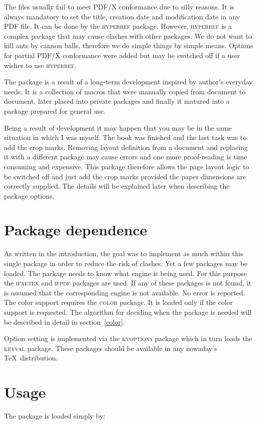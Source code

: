 \documentclass[11pt]{article}
\let\pkg\textsc
\begin{document}
The files usually fail to meet PDF/X conformance due to silly reasons. It is always mandatory to
set the title, creation date and modification date in any PDF file. It can be done by the
\pkg{hyperref} package. However, \pkg{hyperref} is a complex package that may cause clashes with
other packages. We do not want to kill ants by cannon balls, therefore we do simple things by simple
means. Options for partial PDF/X conformance were added but may be switched off if a user wishes to
use \pkg{hyperref}.

The package is a result of a long-term development inspired by author's everyday needs. It is a
collection of macros that were manually copied from document to document, later placed into private
packages and finally it matured into a package prepared for general use.

Being a result of development it may happen that you may be in the same situation in which I was
myself. The book was finished and the last task was to add the crop marks. Removing layout
definition from a document and replacing it with a different package may cause errors and one more
proof-reading is time consuming and expensive. This package therefore allows the page layout logic
to be switched off and just add the crop marks provided the paper dimensions are correctly
supplied. The details will be explained later when describing the package options.

\section{Package dependence}
As written in the introduction, the goal was to implement as much within this single package in
order to reduce the risk of clashes. Yet a few packages may be loaded. The package needs to know
what engine is being used. For this purpose the \pkg{ifxetex} and \pkg{ifpdf} packages are used. If
any of these packages is not found, it is assumed that the corresponding engine is not available.
No error is reported. The color support requires the \pkg{color} package. It is loaded only if the
color support is requested. The algorithm for deciding when the package is needed will be described
in detail in section~\ref{color}.

Option setting is implemented via the \pkg{kvoptions} package which in turn loads the \pkg{keyval}
package. These packages should be available in any nowaday's \TeX\ distribution.

\section{Usage}
The package is loaded simply by:
\end{document}
